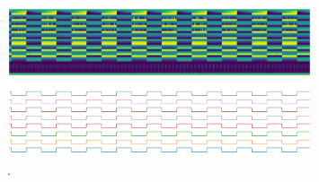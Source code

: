 \begin{figure}
\begin{centering}
% 
\includegraphics[width=0.8\textwidth]{Cap2/Figures/data_cleaning.png}
\par\end{centering}
\caption{.}
\label{fig:data_cleaning}
\end{figure}